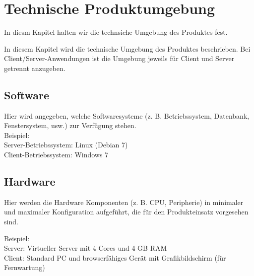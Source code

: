 

\chapter{Technische Produktumgebung}
\label{chap:tech_env}

In diesm Kapitel halten wir die technsiche Umgebung des Produktes fest.

In diesem Kapitel wird die technische Umgebung des Produktes beschrieben. Bei
Client/Server-Anwendungen ist die Umgebung jeweils für Client und Server
getrennt anzugeben.

\section{Software}
Hier wird angegeben, welche Softwaresysteme (z. B. Betriebssystem, Datenbank,
Fenstersystem, usw.) zur Verfügung stehen.\\

Beispiel:\\
Server-Betriebssystem: Linux (Debian 7)\\
Client-Betriebssystem: Windows 7\\


\section{Hardware}
Hier werden die Hardware Komponenten (z. B. CPU, Peripherie) in minimaler und
maximaler Konfiguration aufgeführt, die für den Produkteinsatz vorgesehen
sind.

Beispiel:\\
Server: Virtueller Server mit 4 Cores und 4 GB RAM \\
Client: Standard PC und browserfähiges Gerät mit Grafikbildschirm (für Fernwartung)\\
